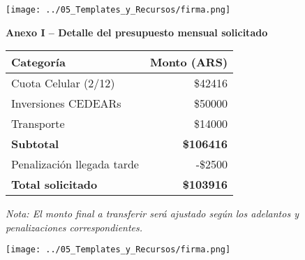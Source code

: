 \documentclass[12pt]{article}
\begin{document}
\vspace{1.4cm}

\begin{flushright}
  \texttt{[image: ../05\_Templates\_y\_Recursos/firma.png]}
\end{flushright}


\newpage

\begin{center}
  \textbf{\large Anexo I – Detalle del presupuesto mensual solicitado}
\end{center}

\vspace{1cm}

\begin{tabular}{|p{8cm}|r|}
\hline
\textbf{Categoría} & \textbf{Monto (ARS)} \\
\hline


Cuota Celular (2/12) & \$42416 \\

Inversiones CEDEARs & \$50000 \\

Transporte & \$14000 \\


\hline
\textbf{Subtotal} & \textbf{\$106416} \\
\hline


Penalización llegada tarde & -\$2500 \\

\hline
\textbf{Total solicitado} & \textbf{\$103916} \\

\hline
\end{tabular}

\vspace{1cm}

\textit{Nota: El monto final a transferir será ajustado según los adelantos y penalizaciones correspondientes.}

\vspace{2cm}

\begin{flushright}
  \texttt{[image: ../05\_Templates\_y\_Recursos/firma.png]}
\end{flushright}
\end{document}
